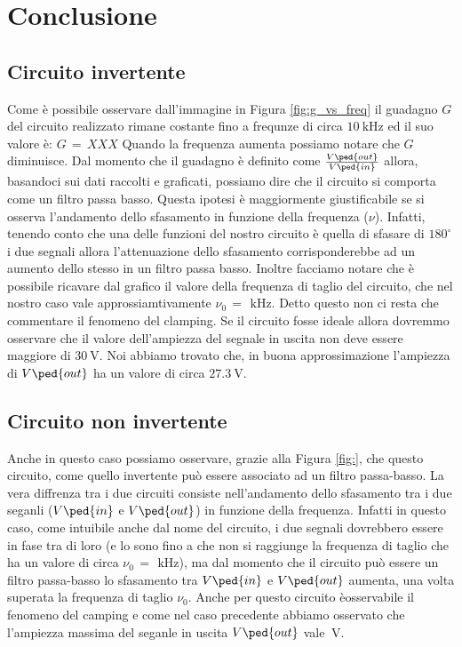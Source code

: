 \section*{Conclusione}

\subsection*{Circuito invertente}

Come è possibile osservare dall'immagine in Figura \ref{fig:g_vs_freq} il guadagno $G$ del circuito realizzato rimane costante fino a frequnze di circa $\SI{10}{\kilo\hertz}$ ed il suo valore è: $G\,=\,XXX$ Quando la frequenza aumenta possiamo notare che $G$ diminuisce. Dal momento che il guadagno è definito come $\frac{V\ped{out}}{V\ped{in}}$ allora, basandoci sui dati raccolti e graficati, possiamo dire che il circuito si comporta come un filtro passa basso. Questa ipotesi è maggiormente giustificabile se si osserva l'andamento dello sfasamento in funzione della frequenza ($\nu$). Infatti, tenendo conto che una delle funzioni del nostro circuito è quella di sfasare di $180^\circ$ i due segnali allora l'attenuazione dello sfasamento corrisponderebbe ad un aumento dello stesso in un filtro passa basso.
Inoltre facciamo notare che è possibile ricavare dal grafico il valore della frequenza di taglio del circuito, che nel nostro caso vale approssiamtivamente $\nu_0\,=\,\SI{}{\kilo\hertz}$.
Detto questo non ci resta che commentare il fenomeno del clamping. Se il circuito fosse ideale allora dovremmo osservare che il valore dell'ampiezza del segnale in uscita non deve essere maggiore di $\SI{30}{\volt}$. Noi abbiamo trovato che, in buona approssimazione l'ampiezza di $V\ped{out}$ ha un valore di circa $\SI{27.3}{\volt}$.   

\subsection*{Circuito non invertente}

Anche in questo caso possiamo osservare, grazie alla Figura \ref{fig:}, che questo circuito, come quello invertente può essere associato ad un filtro passa-basso. La vera diffrenza tra i due circuiti consiste nell'andamento dello sfasamento tra i due seganli ($V\ped{in}$ e $V\ped{out}$) in funzione della frequenza. Infatti in questo caso, come intuibile anche dal nome del circuito, i due segnali dovrebbero essere in fase tra di loro (e lo sono fino a che non si raggiunge la frequenza di taglio che ha un valore di circa $\nu_0\,=\,\SI{}{\kilo\hertz}$), ma dal momento che il circuito può essere un filtro passa-basso lo sfasamento tra $V\ped{in}$ e $V\ped{out}$ aumenta, una volta superata la frequenza di taglio $\nu_0$. Anche per questo circuito èosservabile il fenomeno del camping e come nel caso precedente abbiamo osservato che l'ampiezza massima  del seganle in uscita $V\ped{out}$ vale $\SI{}{\volt}$.  